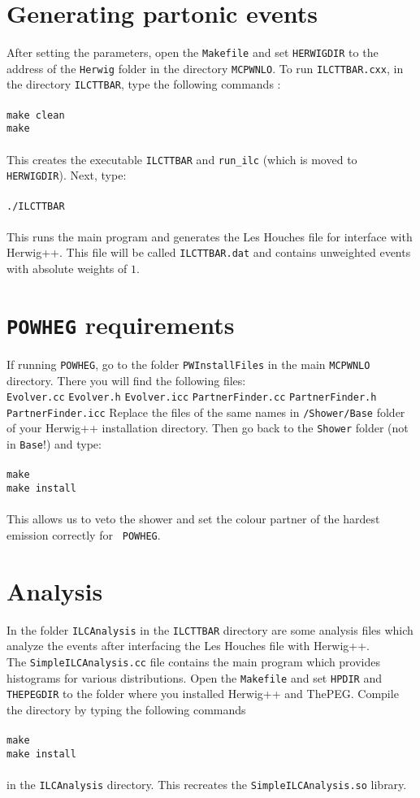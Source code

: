 \documentclass[12pt,a4paper,oneside]{article}
\begin{document}
\section{Generating partonic events}
After setting the parameters, open the {\tt Makefile} and set {\tt HERWIGDIR} to the address of the {\tt Herwig} folder
in the directory {\tt MCPWNLO}. 
To run {\tt ILCTTBAR.cxx}, in the directory {\tt ILCTTBAR}, type the following commands :\\
\\
{\tt make clean} \\
{\tt make} \\
\\
This creates the executable {\tt ILCTTBAR} and {\tt run\_ilc} (which is moved to {\tt
  HERWIGDIR}). Next, type: \\
\\
{\tt ./ILCTTBAR} \\ 
\\
This runs the main program and generates the Les Houches file for interface with \textsf{Herwig++}. This file will be called {\tt ILCTTBAR.dat} and contains unweighted events with absolute weights
of $1$.
\section{{\tt POWHEG} requirements}
If running {\tt POWHEG}, go to the folder {\tt PWInstallFiles} in the main {\tt MCPWNLO}
directory. There you will find the following files:\\
{\tt Evolver.cc} {\tt Evolver.h} {\tt Evolver.icc} {\tt PartnerFinder.cc}  {\tt PartnerFinder.h}  {\tt PartnerFinder.icc}
Replace the files of the same names in {\tt /Shower/Base} folder of your \textsf{Herwig++}
installation directory. Then go back to the {\tt Shower} folder (not in {\tt Base}!) and type: \\
\\
{\tt make} \\
{\tt make install} \\
\\
This allows us to veto the shower and set the colour partner of the hardest emission correctly for {\tt
  POWHEG}.
\section{Analysis} 

In the folder {\tt ILCAnalysis} in the {\tt ILCTTBAR} directory are some analysis files
which analyze the events after interfacing the Les Houches file with
\textsf{Herwig++}. \\ The
{\tt SimpleILCAnalysis.cc} file contains the main program which provides
histograms for various distributions. Open the {\tt Makefile} and set {\tt HPDIR} and
{\tt THEPEGDIR} to the folder where you installed \textsf{Herwig++} and \textsf{ThePEG}. Compile the directory by typing the following commands\\
\\
{\tt make} \\
{\tt make install} \\
\\
in the {\tt ILCAnalysis} directory. This recreates the {\tt SimpleILCAnalysis.so} library.
\end{document}

